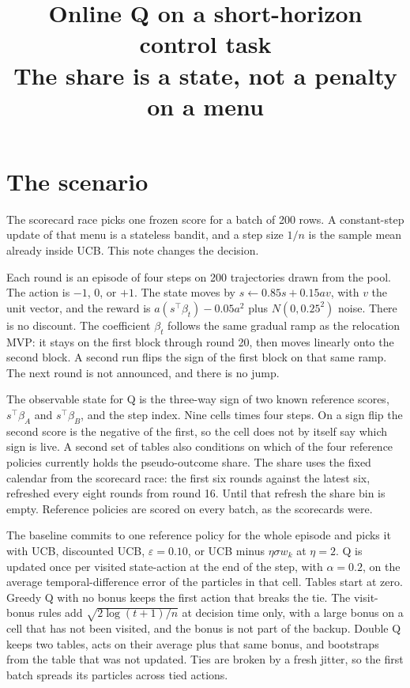 \documentclass[11pt]{article}
\title{Online Q on a short-horizon control task\\
\large The share is a state, not a penalty on a menu}
\author{}
\date{}
\begin{document}
\maketitle

\section{The scenario}

The scorecard race picks one frozen score for a batch of 200 rows. A
constant-step update of that menu is a stateless bandit, and a step size
\(1/n\) is the sample mean already inside UCB. This note changes the decision.

Each round is an episode of four steps on 200 trajectories drawn from the
pool. The action is \(-1\), \(0\), or \(+1\). The state moves by
\(s\leftarrow 0.85 s + 0.15 a v\), with \(v\) the unit vector, and the reward is
\(a(s^\top\beta_t)-0.05 a^2\) plus \(N(0,0.25^2)\) noise. There is no discount.
The coefficient \(\beta_t\) follows the same gradual ramp as the relocation MVP:
it stays on the first block through round 20, then moves linearly onto the
second block. A second run flips the sign of the first block on that same
ramp. The next round is not announced, and there is no jump.

The observable state for Q is the three-way sign of two known reference
scores, \(s^\top\beta_A\) and \(s^\top\beta_B\), and the step index. Nine
cells times four steps. On a sign flip the second score is the negative of
the first, so the cell does not by itself say which sign is live. A second
set of tables also conditions on which of the four reference policies
currently holds the pseudo-outcome share. The share uses the fixed calendar
from the scorecard race: the first six rounds against the latest six, refreshed
every eight rounds from round 16. Until that refresh the share bin is empty.
Reference policies are scored on every batch, as the scorecards were.

The baseline commits to one reference policy for the whole episode and picks
it with UCB, discounted UCB, \(\varepsilon=0.10\), or UCB minus \(\eta\sigma w_k\)
at \(\eta=2\). Q is updated once per visited state-action at the end of the
step, with \(\alpha=0.2\), on the average temporal-difference error of the
particles in that cell. Tables start at zero. Greedy Q with no bonus keeps
the first action that breaks the tie. The visit-bonus rules add
\(\sqrt{2\log(t+1)/n}\) at decision time only, with a large bonus on a
cell that has not been visited, and the bonus is not part of the backup.
Double Q keeps two tables, acts on their average plus that same bonus, and
bootstraps from the table that was not updated. Ties are broken by a fresh
jitter, so the first batch spreads its particles across tied actions.
\end{document}
